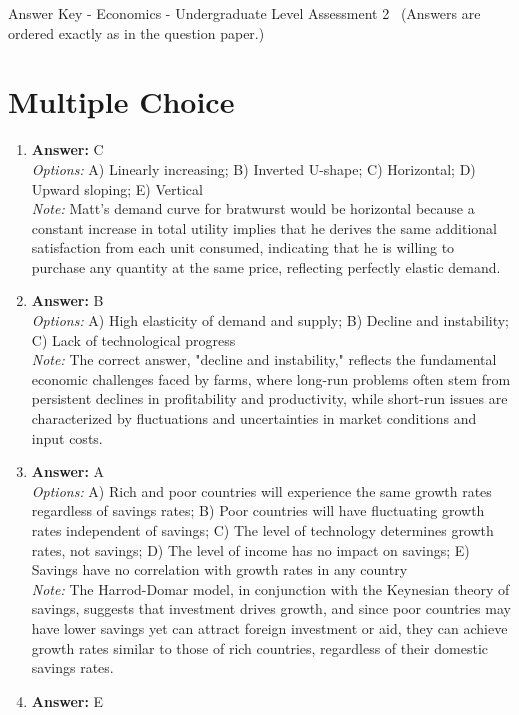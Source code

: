 \documentclass[12pt]{article}
\begin{document}
\begin{center}
Answer Key - Economics - Undergraduate Level Assessment 2 \
\small (Answers are ordered exactly as in the question paper.)
\end{center}

\section*{Multiple Choice}
\begin{enumerate}[label=\arabic*.]
\item \textbf{Answer:} C
\\ \textit{Options:} A) Linearly increasing; B) Inverted U-shape; C) Horizontal; D) Upward sloping; E) Vertical
\\ \textit{Note:} Matt's demand curve for bratwurst would be horizontal because a constant increase in total utility implies that he derives the same additional satisfaction from each unit consumed, indicating that he is willing to purchase any quantity at the same price, reflecting perfectly elastic demand.
\item \textbf{Answer:} B
\\ \textit{Options:} A) High elasticity of demand and supply; B) Decline and instability; C) Lack of technological progress
\\ \textit{Note:} The correct answer, "decline and instability," reflects the fundamental economic challenges faced by farms, where long-run problems often stem from persistent declines in profitability and productivity, while short-run issues are characterized by fluctuations and uncertainties in market conditions and input costs.
\item \textbf{Answer:} A
\\ \textit{Options:} A) Rich and poor countries will experience the same growth rates regardless of savings rates; B) Poor countries will have fluctuating growth rates independent of savings; C) The level of technology determines growth rates, not savings; D) The level of income has no impact on savings; E) Savings have no correlation with growth rates in any country
\\ \textit{Note:} The Harrod-Domar model, in conjunction with the Keynesian theory of savings, suggests that investment drives growth, and since poor countries may have lower savings yet can attract foreign investment or aid, they can achieve growth rates similar to those of rich countries, regardless of their domestic savings rates.
\item \textbf{Answer:} E

\end{enumerate}
\end{document}
